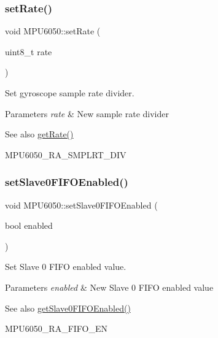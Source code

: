 \subsubsection{\texorpdfstring{setRate()}{setRate()}}
{\footnotesize\ttfamily void M\+P\+U6050\+::set\+Rate (\begin{DoxyParamCaption}\item[{uint8\+\_\+t}]{rate }\end{DoxyParamCaption})}

Set gyroscope sample rate divider. 
\begin{DoxyParams}{Parameters}
{\em rate} & New sample rate divider \\
\hline
\end{DoxyParams}
\begin{DoxySeeAlso}{See also}
\mbox{\hyperlink{class_m_p_u6050_a887a173e079980505763ffd1aa9fec05}{get\+Rate()}} 

M\+P\+U6050\+\_\+\+R\+A\+\_\+\+S\+M\+P\+L\+R\+T\+\_\+\+D\+IV 
\end{DoxySeeAlso}
\mbox{\label{class_m_p_u6050_a97fbf27e1b827f9dfc3c28ff376b54c4}} 
\subsubsection{\texorpdfstring{setSlave0FIFOEnabled()}{setSlave0FIFOEnabled()}}
{\footnotesize\ttfamily void M\+P\+U6050\+::set\+Slave0\+F\+I\+F\+O\+Enabled (\begin{DoxyParamCaption}\item[{bool}]{enabled }\end{DoxyParamCaption})}

Set Slave 0 F\+I\+FO enabled value. 
\begin{DoxyParams}{Parameters}
{\em enabled} & New Slave 0 F\+I\+FO enabled value \\
\hline
\end{DoxyParams}
\begin{DoxySeeAlso}{See also}
\mbox{\hyperlink{class_m_p_u6050_a6aa7aa2e3fac06f8b5ab9ee127255a5e}{get\+Slave0\+F\+I\+F\+O\+Enabled()}} 

M\+P\+U6050\+\_\+\+R\+A\+\_\+\+F\+I\+F\+O\+\_\+\+EN 
\end{DoxySeeAlso}
\mbox{\label{class_m_p_u6050_a5d432fa2fb8b2227f50aa5c7b5befb66}} 

